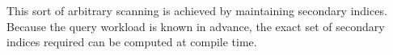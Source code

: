 This sort of arbitrary scanning is achieved by maintaining secondary indices.  Because the query workload is known in advance, the exact set of secondary indices required can be computed at compile time.  


%
%
%
%
%
%
%
